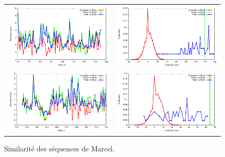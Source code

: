 \documentclass[a4paper,12pt]{article}
\begin{document}
   \begin{figure}[t]
     \centering
     \begin{tabular}{cc}
       \includegraphics[width=8.45cm]{marcel_seq/1ZFP/similarity_bypos.pdf} &
       \includegraphics[width=8.45cm]{marcel_seq/1ZFP/similarity_byseq_frequency.pdf} \\
       \includegraphics[width=8.45cm]{marcel_seq/2FE5/similarity_bypos.pdf} &
       \includegraphics[width=8.45cm]{marcel_seq/2FE5/similarity_byseq_frequency.pdf} \\

     \end{tabular}

     \caption{Similarité des séquences de Marcel.}

   \end{figure}
\end{document}
